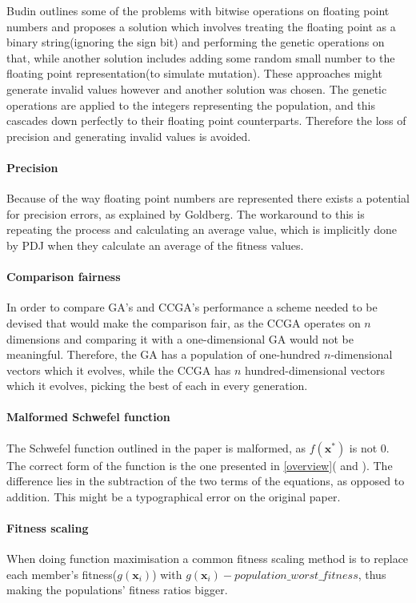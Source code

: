 \documentclass[12pt,a4paper,onecolumn]{article}
\begin{document}
Budin\cite{floats} outlines some of the problems with bitwise operations on floating point numbers and proposes a solution which involves treating the floating point as a binary string(ignoring the sign bit) and performing the genetic operations on that, while another solution includes adding some random small number to the floating point representation(to simulate mutation). These approaches might generate invalid values however and another solution was chosen. The genetic operations are applied to the integers representing the population, and this cascades down perfectly to their floating point counterparts. Therefore the loss of precision and generating invalid values is avoided.
\paragraph{Precision} Because of the way floating point numbers are represented there exists a potential for precision errors, as explained by Goldberg\cite{float_error}. The workaround to this is repeating the process and calculating an average value, which is implicitly done by PDJ when they calculate an average of the fitness values.
\paragraph{Comparison fairness} In order to compare GA's and CCGA's performance a scheme needed to be devised that would make the comparison fair, as the CCGA operates on $n$ dimensions and comparing it with a one-dimensional GA would not be meaningful. Therefore, the GA has a population of one-hundred $n$-dimensional vectors which it evolves, while the CCGA has $n$ hundred-dimensional vectors which it evolves, picking the best of each in every generation.
\paragraph{Malformed Schwefel function} The Schwefel function outlined in the paper is malformed, as $f(\mathbf{x}^*)$ is not $0$. The correct form of the function is the one presented in \ref{overview}(\cite{schwe_correct} and \cite{website:matlab_schwe}). The difference lies in the subtraction of the two terms of the equations, as opposed to addition. This might be a typographical error on the original paper.
\paragraph{Fitness scaling} When doing function maximisation a common fitness scaling method is to replace each member's fitness($g(\mathbf{x}_i)$) with $g(\mathbf{x}_i) - population\_worst\_fitness$, thus making the populations' fitness ratios bigger.
\end{document}
